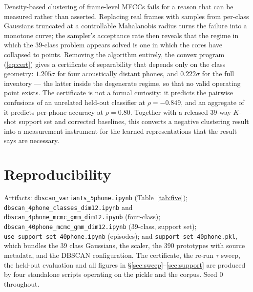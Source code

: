 \documentclass[11pt]{article}
\begin{document}
Density-based clustering of frame-level MFCCs fails for a reason that can be
measured rather than asserted. Replacing real frames with samples from per-class
Gaussians truncated at a controllable Mahalanobis radius turns the failure into
a monotone curve; the sampler's acceptance rate then reveals that the regime in
which the 39-class problem appears solved is one in which the cores have
collapsed to points. Removing the algorithm entirely, the convex program
(\ref{eq:cert}) gives a certificate of separability that depends only on the
class geometry: $1.205\sigma$ for four acoustically distant phones, and
$0.222\sigma$ for the full inventory --- the latter inside the degenerate
regime, so that no valid operating point exists. The certificate is not a
formal curiosity: it predicts the pairwise confusions of an unrelated
held-out classifier at $\rho = -0.849$, and an aggregate of it predicts
per-phone accuracy at $\rho = 0.80$. Together with a released 39-way $K$-shot
support set and corrected baselines, this converts a negative clustering result
into a measurement instrument for the learned representations that the result
says are necessary.

\section*{Reproducibility}

Artifacts: \texttt{dbscan\_variants\_5phone.ipynb} (Table~\ref{tab:five});
\texttt{dbscan\_4phone\_classes\_dim12.ipynb} and
\texttt{dbscan\_4phone\_mcmc\_gmm\_dim12.ipynb} (four-class);
\texttt{dbscan\_40phone\_mcmc\_gmm\_dim12.ipynb} (39-class, support set);
\texttt{use\_support\_set\_40phone.ipynb} (episodes); and
\texttt{support\_set\_40phone.pkl}, which bundles the 39 class Gaussians, the
scaler, the 390 prototypes with source metadata, and the DBSCAN configuration.
The certificate, the re-run $\tau$ sweep, the held-out evaluation and all
figures in \S\ref{sec:sweep}--\ref{sec:support} are produced by four standalone
scripts operating on the pickle and the corpus. Seed $0$ throughout.
\end{document}
